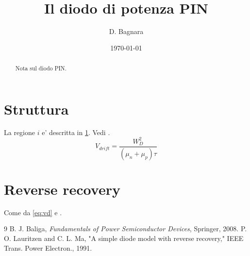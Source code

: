 \documentclass[11pt,a4paper]{article}
\title{Il diodo di potenza PIN}
\author{D. Bagnara}
\date{\today}
\begin{document}
\maketitle
\tableofcontents
\begin{abstract}
Nota sul diodo PIN.
\end{abstract}
\section{Struttura}
\label{sec:struct}
La regione $i$ e' descritta in \ref{sec:struct}. Vedi \cite{baliga}.
\begin{equation}\label{eq:vd}
V_{drift}=\frac{W_D^2}{(\mu_n+\mu_p)\tau}
\end{equation}
\section{Reverse recovery}
Come da \eqref{eq:vd} e \cite{lauritzen1991}.
\begin{thebibliography}{9}
 B. J. Baliga, \emph{Fundamentals of Power Semiconductor Devices}, Springer, 2008.
 P. O. Lauritzen and C. L. Ma, "A simple diode model with reverse recovery," IEEE Trans. Power Electron., 1991.
\end{thebibliography}
\end{document}
